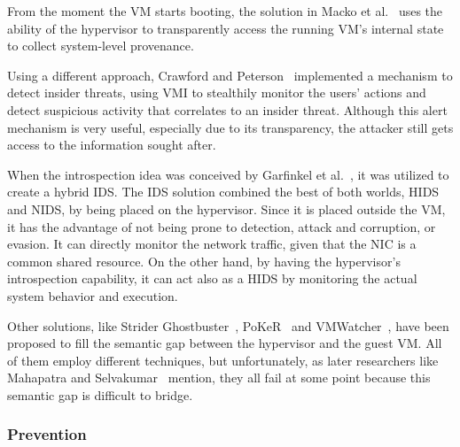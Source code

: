 \par From the moment the \ac{VM} starts booting, the solution in Macko et al.~\cite{macko2011collecting} uses the ability of the hypervisor to transparently access the running \ac{VM}’s internal state to collect system-level provenance. 

\par Using a different approach, Crawford and Peterson~\cite{crawford2013insider} implemented a mechanism to detect insider threats, using \ac{VMI} to stealthily monitor the users' actions and detect suspicious activity that correlates to an insider threat. Although this alert mechanism is very useful, especially due to its transparency, the attacker still gets access to the information sought after.

\par When the introspection idea was conceived by Garfinkel et al.~\cite{garfinkel2003virtual}, it was utilized to create a hybrid \ac{IDS}. The \ac{IDS} solution combined the best of both worlds, \ac{HIDS} and \ac{NIDS}, by being placed on the hypervisor. Since it is placed outside the \ac{VM}, it has the advantage of not being prone to detection, attack and corruption, or evasion. It can directly monitor the network traffic, given that the \ac{NIC} is a common shared resource. On the other hand, by having the hypervisor’s introspection capability, it can act also as a \ac{HIDS} by monitoring the actual system behavior and execution. 

\par Other solutions, like Strider Ghostbuster~\cite{wang2005detecting}, PoKeR~\cite{riley2009multi} and VMWatcher~\cite{jiang2007stealthy}, have been proposed to fill the semantic gap between the hypervisor and the guest \ac{VM}. All of them employ different techniques, but unfortunately, as later researchers like Mahapatra and Selvakumar~\cite{mahapatra2011online} mention, they all fail at some point because this semantic gap is difficult to bridge. 

\subsubsection{Prevention}

